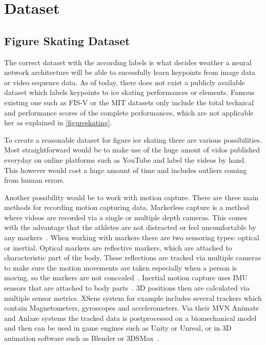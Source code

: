 

\chapter{Dataset} %

\label{Synthetic Dataset} %



\section{Figure Skating Dataset}

The correct dataset with the according labels is what decides weather a neural network architecture will be able
to sucessfully learn keypoints from image data or video sequence data.
As of today, there does not exist a publicly available dataset which labels keypoints to ice skating performances or
elements.
Famous existing one such as FIS-V or the MIT datasets only include the total technical and performance scores of the
complete performances, which are not applicable her as explained in \autoref{figureskating}.

To create a reasonable dataset for figure ice skating there are various possibilities.
Most straightforward would be to make use of the huge amout of vidos published everyday on online platforms such as
YouTube and label the videos by hand. This however would cost a huge amount of time and includes outliers coming from
human errors.

Another possibility would be to work with motion capture.
There are three main methods for recording motion capturing data.
Markerless capture is a method where videos are recorded via a single or multiple depth cameras.
This comes with the advantage that the athletes are not distracted or feel uncomfortable by any
markers~\cite{mocapopticalradical, mocapopticalcapture, mocapmarkerless3dscans}.
When working with markers there are two sensoring types: optical or inertial.
Optical markers are reflective markers, which are attached to characteristic part of the body.
These reflections are tracked via multiple cameras to make sure the motion movements are taken especially when a
person is moving, so the markers are not concealed~\cite{mocapoptical}.
Inertial motion capture uses IMU sensors that are attached to body parts~\cite{xsens, mocapinterialneuron}.
3D positions then are calculated via multiple sensor metrics.
XSens system for example includes several trackers which contain Magnetometers, gyroscopes and accelerometers.
Via their MVN Animate and Anlaze systems the tracked data is postprocessed on a biomechanical model
and then can be used in game engines such as Unity or Unreal, or in 3D animation software such as Blender or
3DSMax~\cite{xsensabout}.

